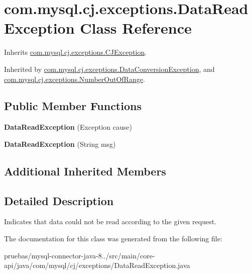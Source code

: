 \hypertarget{classcom_1_1mysql_1_1cj_1_1exceptions_1_1_data_read_exception}{}\section{com.\+mysql.\+cj.\+exceptions.\+Data\+Read\+Exception Class Reference}
\label{classcom_1_1mysql_1_1cj_1_1exceptions_1_1_data_read_exception}


Inherits \mbox{\hyperlink{classcom_1_1mysql_1_1cj_1_1exceptions_1_1_c_j_exception}{com.\+mysql.\+cj.\+exceptions.\+C\+J\+Exception}}.



Inherited by \mbox{\hyperlink{classcom_1_1mysql_1_1cj_1_1exceptions_1_1_data_conversion_exception}{com.\+mysql.\+cj.\+exceptions.\+Data\+Conversion\+Exception}}, and \mbox{\hyperlink{classcom_1_1mysql_1_1cj_1_1exceptions_1_1_number_out_of_range}{com.\+mysql.\+cj.\+exceptions.\+Number\+Out\+Of\+Range}}.

\subsection*{Public Member Functions}
\begin{DoxyCompactItemize}
\item 
\mbox{\label{classcom_1_1mysql_1_1cj_1_1exceptions_1_1_data_read_exception_ade63ac9f329e88a0329c846d0e921d65}} 
{\bfseries Data\+Read\+Exception} (Exception cause)
\item 
\mbox{\label{classcom_1_1mysql_1_1cj_1_1exceptions_1_1_data_read_exception_a34be28306c933033e6dd220c1547db1a}} 
{\bfseries Data\+Read\+Exception} (String msg)
\end{DoxyCompactItemize}
\subsection*{Additional Inherited Members}


\subsection{Detailed Description}
Indicates that data could not be read according to the given request. 

The documentation for this class was generated from the following file\+:\begin{DoxyCompactItemize}
\item 
pruebas/mysql-\/connector-\/java-\/8../src/main/core-\/api/java/com/mysql/cj/exceptions/Data\+Read\+Exception.\+java\end{DoxyCompactItemize}
